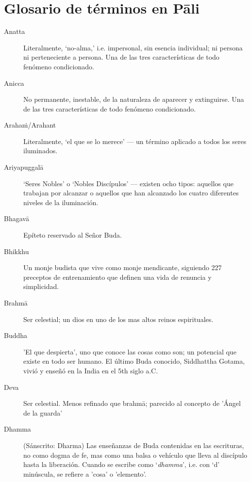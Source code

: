 \chapter{Glosario de términos en Pāli }

\enlargethispage{2\baselineskip}

\begin{description}

\item[Anatta] Literalmente, `no-alma,' i.e. impersonal, sin esencia individual;
 ni persona ni perteneciente a persona. Una de las tres características de todo fenómeno condicionado.

\item[Anicca] No permanente, inestable, de la naturaleza de aparecer y extinguirse. Una de las tres características de todo fenómeno condicionado.

\item[Arahaṁ/Arahant] Literalmente, ‘el que se lo merece’ --- un término aplicado a todos los seres iluminados. 

\item[Ariyapuggalā] ‘Seres Nobles’ o ‘Nobles Discípulos’ --- existen ocho tipos: aquellos que trabajan por alcanzar o aquellos que han alcanzado los cuatro diferentes niveles de la iluminación.

\item[Bhagavā] Epíteto reservado al Señor Buda.

\item[Bhikkhu] Un monje budista que vive como monje mendicante, siguiendo 227 preceptos de entrenamiento que definen una vida de renuncia y simplicidad.

\item[Brahmā] Ser celestial; un dios en uno de los mas altos reinos espirituales.

\item[Buddha] 'El que despierta', uno que conoce las cosas como son; un potencial que existe en todo ser humano. El último Buda conocido,
  Siddhattha Gotama, vivió y enseñó en la India en el 5th siglo a.C.

\item[Deva] Ser celestial. Menos refinado que brahmā; parecido al concepto de 'Ángel de la guarda'

\item[Dhamma] (Sánscrito: Dharma) Las enseñanzas de Buda contenidas en las escrituras, no como dogma de fe, mas como una balsa o vehículo que lleva al discípulo hasta la liberación. Cuando se escribe como ‘\emph{dhamma}’, i.e.
  con `d' minúscula, se refiere a 'cosa’ o 'elemento'.


\end{description}
